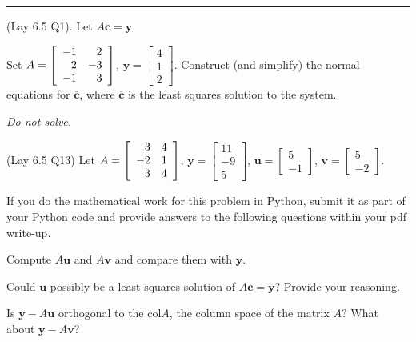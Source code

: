 \documentclass[12pt,letterpaper,noanswers]{exam}
\newcommand{\mathbf}[1]{\boldsymbol{#1}}
\begin{document}
 \vspace{0.2cm}
\hrule
 \vspace{0.2cm}
\begin{questions}
\question (Lay 6.5 Q1). Let $A\mathbf{c} = \mathbf{y}$.

Set $A = \left[\begin{array}{r r} -1 & 2 \\ 2 & -3 \\ -1 & 3\end{array}  \right]$, $\mathbf{y}= \left[\begin{array}{r} 4 \\ 1 \\ 2 \end{array} \right]$.  Construct (and simplify) the normal equations for $\overline{\mathbf{c}}$, where $\overline{\mathbf{c}}$ is the least squares solution to the system.

\emph{Do not solve.}

\question (Lay 6.5 Q13) Let $A = \left[\begin{array}{r r} 3 & 4 \\ -2 & 1 \\ 3 & 4\end{array}  \right]$, $\mathbf{y}= \left[\begin{array}{r} 11 \\ -9 \\ 5 \end{array} \right]$, $\mathbf{u}= \left[\begin{array}{r} 5 \\ -1 \end{array} \right]$, $\mathbf{v}= \left[\begin{array}{r} 5 \\ -2 \end{array} \right]$.



If you do the mathematical work for this problem in Python, submit it as part of your Python code and provide answers to the following questions within your pdf write-up.

\begin{parts}
    \item Compute $A\mathbf{u}$ and $A\mathbf{v}$ and compare them with $\mathbf{y}$.
    \item Could $\mathbf{u}$ possibly be a least squares solution of $A\mathbf{c} = \mathbf{y}$?  Provide your reasoning.
    \item Is $\mathbf{y} - A\mathbf{u}$ orthogonal to the $\text{col} A$, the column space of the matrix $A$?  What about $\mathbf{y} - A\mathbf{v}$?


\end{parts}
\end{questions}
\end{document}
